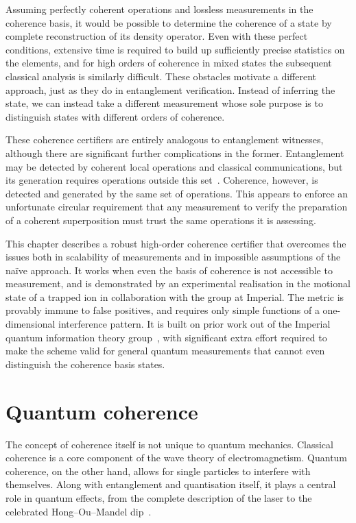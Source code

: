 Assuming perfectly coherent operations and lossless measurements in the coherence basis, it would be possible to determine the coherence of a state by complete reconstruction of its density operator.
Even with these perfect conditions, extensive time is required to build up sufficiently precise statistics on the elements, and for high orders of coherence in mixed states the subsequent classical analysis is similarly difficult.
These obstacles motivate a different approach, just as they do in entanglement verification.
Instead of inferring the state, we can instead take a different measurement whose sole purpose is to distinguish states with different orders of coherence.

These coherence certifiers are entirely analogous to entanglement witnesses, although there are significant further complications in the former.
Entanglement may be detected by coherent local operations and classical communications, but its generation requires operations outside this set~\cite{Peres1996}.
Coherence, however, is detected and generated by the same set of operations.
This appears to enforce an unfortunate circular requirement that any measurement to verify the preparation of a coherent superposition must trust the same operations it is assessing.

This chapter describes a robust high-order coherence certifier that overcomes the issues both in scalability of measurements and in impossible assumptions of the na\"ive approach.
It works when even the basis of coherence is not accessible to measurement, and is demonstrated by an experimental realisation in the motional state of a trapped ion in collaboration with the group at Imperial.
The metric is provably immune to false positives, and requires only simple functions of a one-dimensional interference pattern.
It is built on prior work out of the Imperial quantum information theory group~\cite{Dive2020}, with significant extra effort required to make the scheme valid for general quantum measurements that cannot even distinguish the coherence basis states.


\section{Quantum coherence}

The concept of coherence itself is not unique to quantum mechanics.
Classical coherence is a core component of the wave theory of electromagnetism.
Quantum coherence, on the other hand, allows for single particles to interfere with themselves.
Along with entanglement and quantisation itself, it plays a central role in quantum effects, from the complete description of the laser to the celebrated Hong--Ou--Mandel dip~\cite{Hong1987}.

